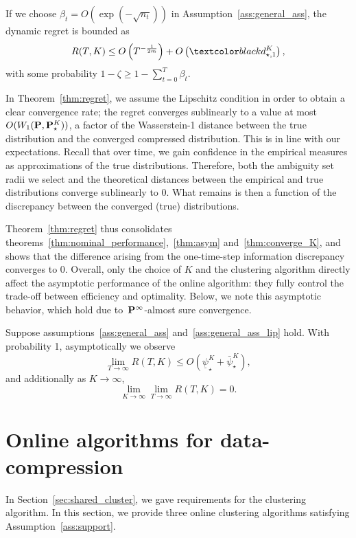 \begin{corollary}
\label{cor:regret_beta}
    If we choose $\beta_t = O(\exp(-\sqrt{n_t}))$ in Assumption~\ref{ass:general_ass}, the dynamic regret is bounded as
    $$R(T,K) \leq O\left(T^{-\frac{1}{2m}}\right) + O\left(\RC{d^K_{\star,1}}\right),$$
   with some probability $1-\zeta \geq 1-\sum_{t=0}^T\beta_t$.
\end{corollary}
In Theorem~\ref{thm:regret}, we assume the Lipschitz condition in order to obtain a clear convergence rate; the regret converges sublinearly to a value at most $O(W_1({\mathbf P},{\mathbf P}^K_\star))$, a factor of the Wasserstein-1 distance between the true distribution and the converged compressed distribution.
This is in line with our expectations.  
Recall that over time, we gain confidence in the empirical measures as approximations of the true distributions. Therefore, both the ambiguity set radii we select and the theoretical distances between the empirical and true distributions converge sublinearly to 0. 
What remains is then a function of the discrepancy between the converged (true) distributions. 

Theorem~\ref{thm:regret} thus consolidates theorems~\ref{thm:nominal_performance},~\ref{thm:asym} and~\ref{thm:converge_K}, and shows that the difference arising from the one-time-step information discrepancy converges to 0.
Overall, only the choice of $K$ and the clustering algorithm directly affect the asymptotic performance of the online algorithm: they fully control the trade-off between efficiency and optimality. 
Below, we note this asymptotic behavior, which hold due to~${\mathbf P}^\infty$-almost sure convergence.
\begin{corollary}
\label{cor:regret}
Suppose assumptions~\ref{ass:general_ass} and~\ref{ass:general_ass_lip} hold.
With probability 1, asymptotically we observe
   $$ \lim_{T\to\infty} R(T,K) \leq O(\underline{\psi}_\star^K + \bar{\psi}_\star^K),$$ and additionally as $K \to \infty$,~$$\lim_{K\to\infty}\lim_{T\to\infty}R(T,K) = 0.$$
\end{corollary}



\section{Online algorithms for data-compression}
\label{sec:algos}
In Section~\ref{sec:shared_cluster}, we gave requirements for the clustering algorithm. In this section, we provide  three  online clustering algorithms satisfying Assumption~\ref{ass:support}.

